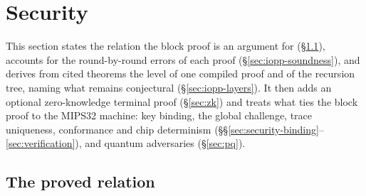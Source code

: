 \section{Security}
\label{sec:security}

This section states the relation the block proof is an argument for (\S\ref{sec:security-relation}), accounts for the round-by-round errors of each proof (\S\ref{sec:iopp-soundness}), and derives from cited theorems the level of one compiled proof and of the recursion tree, naming what remains conjectural (\S\ref{sec:iopp-layers}). It then adds an optional zero-knowledge terminal proof (\S\ref{sec:zk}) and treats what ties the block proof to the MIPS32 machine: key binding, the global challenge, trace uniqueness, conformance and chip determinism (\S\S\ref{sec:security-binding}--\ref{sec:verification}), and quantum adversaries (\S\ref{sec:pq}).

\subsection{The proved relation}
\label{sec:security-relation}

